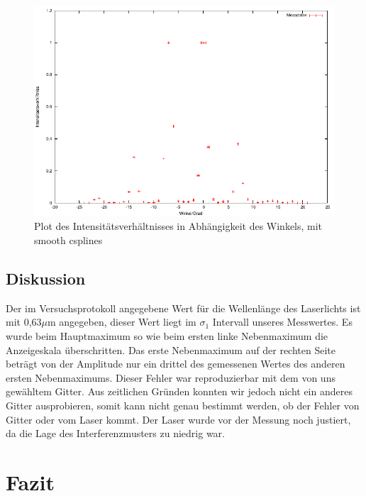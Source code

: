 \documentclass[12pt]{scrartcl}
\begin{document}
\begin{figure}[H]
\centering
    \includegraphics[scale = 1]{a_4.pdf}
  	\caption[Plot des Intensitätsverhältnisses in Abhängigkeit des Winkels, mit smooth csplines]{Plot des Intensitätsverhältnisses in Abhängigkeit des Winkels, mit smooth csplines}
  \label{fig:a_4}
\end{figure}


\subsection{Diskussion}
Der im Versuchsprotokoll angegebene Wert für die Wellenlänge des Laserlichts ist mit 0,63$\mu$m angegeben, dieser Wert liegt im $\sigma_1$ Intervall unseres Messwertes. Es wurde beim Hauptmaximum so wie beim ersten linke Nebenmaximum die Anzeigeskala überschritten. Das erste Nebenmaximum auf der rechten Seite beträgt von der Amplitude nur ein drittel des gemessenen Wertes des anderen ersten Nebenmaximums. Dieser Fehler war reproduzierbar mit dem von uns gewähltem Gitter. Aus zeitlichen Gründen konnten wir jedoch nicht ein anderes Gitter ausprobieren, somit kann nicht genau bestimmt werden, ob der Fehler von Gitter oder vom Laser kommt. Der Laser wurde vor der Messung noch justiert, da die Lage des Interferenzmusters zu niedrig war.

\section{Fazit}


\end{document}
